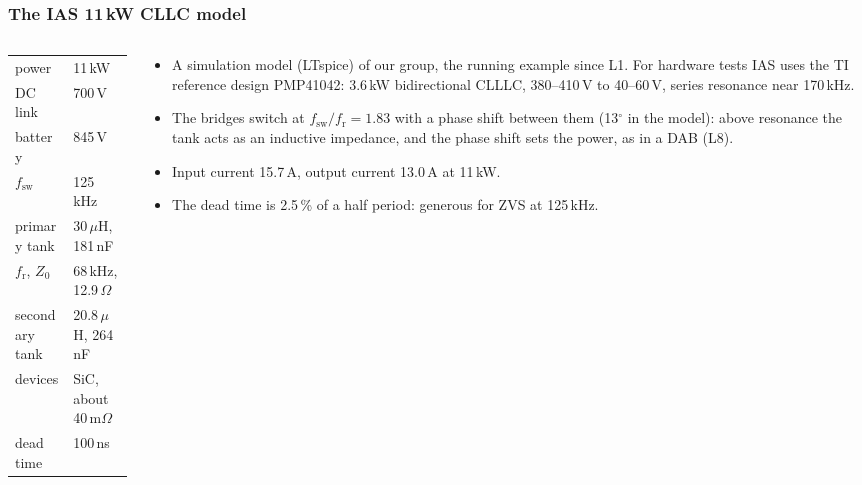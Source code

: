 \begin{frame}
	\frametitle{The IAS 11\,kW CLLC model}
	\begin{columns}[T]
		\begin{column}{0.4\textwidth}
			\footnotesize
			\begin{tabular}{|l|l|}
				\hline
				power                 & 11\,kW                           \\
				DC link               & 700\,V                           \\
				battery               & 845\,V                           \\
				$f_\mathrm{sw}$       & 125\,kHz                         \\
				primary tank          & 30\,$\mu$H, 181\,nF              \\
				$f_\mathrm{r}$, $Z_0$ & 68\,kHz, 12.9\,$\Omega$          \\
				secondary tank        & 20.8\,$\mu$H, 264\,nF            \\
				devices               & SiC, about 40\,m$\Omega$        \\
				dead time             & 100\,ns                          \\
				\hline
			\end{tabular}
		\end{column}
		\begin{column}{0.55\textwidth}
			\small
			\begin{itemize}
				\item A simulation model (LTspice) of our group, the running example since L1. For hardware tests IAS uses the TI reference design PMP41042: 3.6\,kW bidirectional CLLLC, 380--410\,V to 40--60\,V, series resonance near 170\,kHz.
				\item The bridges switch at $f_\mathrm{sw}/f_\mathrm{r}=1.83$ with a phase shift between them (13$^\circ$ in the model): above resonance the tank acts as an inductive impedance, and the phase shift sets the power, as in a DAB (L8).
				\item Input current 15.7\,A, output current 13.0\,A at 11\,kW.
				\item The dead time is 2.5\,\% of a half period: generous for ZVS at 125\,kHz.
			\end{itemize}
		\end{column}
	\end{columns}
\end{frame}

